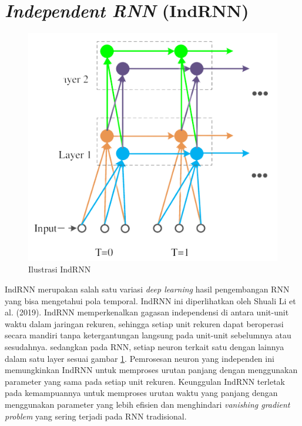 \section{\emph{Independent RNN} (IndRNN)}

\begin{figure} [H] \centering
  \includegraphics[scale=0.45]{gambar/indrnn.png}
  \caption{Ilustrasi IndRNN \parencite{8}}
  \label{fig:indrnn}
\end{figure}

IndRNN merupakan salah satu variasi \emph{deep learning} hasil pengembangan RNN yang bisa mengetahui pola temporal. IndRNN ini
diperlihatkan oleh Shuali Li et al. (2019). IndRNN memperkenalkan gagasan independensi di antara unit-unit waktu dalam jaringan rekuren,
sehingga setiap unit rekuren dapat beroperasi secara mandiri tanpa ketergantungan langsung pada unit-unit sebelumnya atau sesudahnya.
sedangkan pada RNN, setiap neuron terkait satu dengan lainnya dalam satu layer sesuai gambar \ref{fig:indrnn}. Pemrosesan neuron yang
independen ini memungkinkan IndRNN untuk memproses urutan panjang dengan menggunakan parameter yang sama pada setiap unit rekuren.
Keunggulan IndRNN terletak pada kemampuannya untuk memproses urutan waktu yang panjang dengan menggunakan parameter yang lebih efisien
dan menghindari \emph{vanishing gradient problem} yang sering terjadi pada RNN tradisional.



